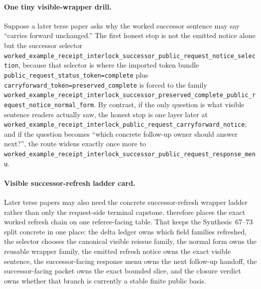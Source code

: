 \documentclass[11pt]{article}
\begin{document}
\paragraph{One tiny visible-wrapper drill.}
Suppose a later terse paper asks why the worked successor sentence may say ``carries forward unchanged.''
The first honest stop is not the emitted notice alone but the successor selector \nolinkurl{worked_example_receipt_interlock_successor_public_request_notice_selection}, because that selector is where the imported token bundle \nolinkurl{public_request_status_token=complete} plus \nolinkurl{carryforward_token=preserved_complete} is forced to the family \nolinkurl{worked_example_receipt_interlock_successor_preserved_complete_public_request_notice_normal_form}.
By contrast, if the only question is what visible sentence readers actually saw, the honest stop is one layer later at \nolinkurl{worked_example_receipt_interlock_public_request_carryforward_notice}; and if the question becomes ``which concrete follow-up owner should answer next?'', the route widens exactly once more to \nolinkurl{worked_example_receipt_interlock_successor_public_request_response_menu}.\cite{series:publicrequestnotices,series:publicrequestnoticenormalforms,series:publicrequestnoticeselections,series:publicrequestresponsemenus}


\paragraph{Visible successor-refresh ladder card.}
Later terse papers may also need the concrete successor-refresh wrapper ladder rather than only the request-side terminal capstone.
 therefore places the exact worked refresh chain on one referee-facing table.
That keeps the Synthesis~67--73 split concrete in one place: the delta ledger owns which field families refreshed, the selector chooses the canonical visible reissue family, the normal form owns the reusable wrapper family, the emitted refresh notice owns the exact visible sentence, the successor-facing response menu owns the next follow-up handoff, the successor-facing packet owns the exact bounded slice, and the closure verdict owns whether that branch is currently a stable finite public basis.\cite{series:publicrequestresponsepacketdeltas,series:publicrequestresponsepacketrefreshnotices,series:publicrequestresponsepacketrefreshnoticenormalforms,series:publicrequestresponsepacketrefreshnoticeselections,series:publicrequestresponsepacketrefreshresponsemenus,series:publicrequestresponsepacketrefreshresponsepackets,series:publicrequestresponsepacketrefreshresponsepacketclosureverdicts}
\end{document}

